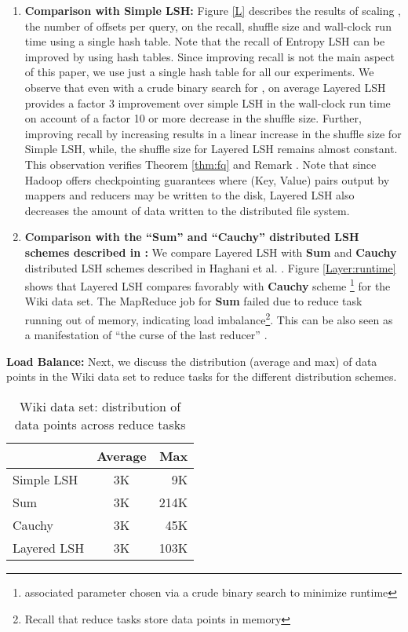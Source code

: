 \documentclass{acm_proc_article-sp}
\numberwithin{equation}{section}
\numberwithin{figure}{section}
\begin{document}
\begin{enumerate}
\item{\bf Comparison with Simple LSH:} 
Figure \ref{L} describes the results of scaling , the number of offsets per query, on the recall, shuffle size and wall-clock run time using a single hash table. Note that the recall of Entropy LSH can be improved by using  hash tables. Since improving recall is not the main aspect of this paper, we use just a single hash table for all our experiments. We observe that even with a crude binary search for , on average Layered LSH provides a factor 3 improvement over simple LSH in the wall-clock run time on account of a factor 10 or more decrease in the shuffle size. Further, improving recall by increasing  results in a linear increase in the shuffle size for Simple LSH, while, the shuffle size for Layered LSH remains almost constant. This observation verifies Theorem \ref{thm:fq} and Remark . Note that since Hadoop offers checkpointing guarantees where (Key, Value) pairs output by mappers and reducers may be written to the disk, Layered LSH also decreases the amount of data written to the distributed file system. 

\item{\bf Comparison with the ``Sum'' and ``Cauchy'' distributed LSH schemes described in \cite{Haghani}:}
We compare Layered LSH with {\bf Sum} and {\bf Cauchy} distributed LSH schemes described in Haghani et al. \cite{Haghani}. Figure \ref{Layer:runtime} shows that Layered LSH compares favorably with {\bf Cauchy} scheme \footnote{associated parameter chosen via a crude binary search to minimize runtime} for the Wiki data set. The MapReduce job for {\bf Sum} failed due to reduce task running out of memory, indicating load imbalance\footnote{Recall that reduce tasks store data points in memory}. This can be also seen as a manifestation of ``the curse of the last reducer'' \cite{curselast}.

\end{enumerate} 

{\bf Load Balance:}
Next, we discuss the distribution (average and max) of data points in the Wiki data set to  reduce tasks for the different distribution schemes. 

\begin{table}
	\begin{center}
\begin{tabular}{ l | c | r }
   & Average & Max \\
  \hline                        
  Simple LSH & 3K & 9K \\
  Sum & 3K & 214K \\
  Cauchy & 3K & 45K \\
  Layered LSH & 3K & 103K \\
\end{tabular}
\caption{Wiki data set: distribution of data points across  reduce tasks}
\label{table:lb}
\end{center}
\end{table}
\end{document}
